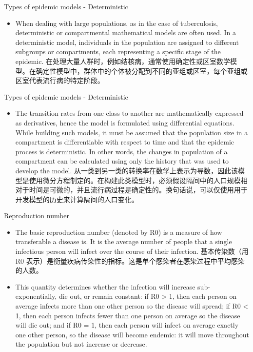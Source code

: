\documentclass[
  notheorems,
  aspectratio=54,
]{beamer}
\begin{document}
\begin{frame}{Types of epidemic models - Deterministic}
  \begin{itemize}
    \item When dealing with large populations, as in the case of tuberculosis, deterministic or compartmental mathematical models are often used. In a deterministic model, individuals in the population are assigned to different subgroups or compartments, each representing a specific stage of the epidemic. 在处理大量人群时，例如结核病，通常使用确定性或区室数学模型。在确定性模型中，群体中的个体被分配到不同的亚组或区室，每个亚组或区室代表流行病的特定阶段。
  \end{itemize}
\end{frame}

\begin{frame}{Types of epidemic models - Deterministic}
  \begin{itemize}
    \item The transition rates from one class to another are mathematically expressed as derivatives, hence the model is formulated using differential equations. While building such models, it must be assumed that the population size in a compartment is differentiable with respect to time and that the epidemic process is deterministic. In other words, the changes in population of a compartment can be calculated using only the history that was used to develop the model. 从一类到另一类的转换率在数学上表示为导数，因此该模型是使用微分方程制定的。在构建此类模型时，必须假设隔间中的人口规模相对于时间是可微的，并且流行病过程是确定性的。换句话说，可以仅使用用于开发模型的历史来计算隔间的人口变化。
  \end{itemize}
\end{frame}

\begin{frame}{Reproduction number}
  \begin{itemize}
    \item The basic reproduction number (denoted by R0) is a measure of how transferable a disease is. It is the average number of people that a single infectious person will infect over the course of their infection. 基本传染数（用 R0 表示）是衡量疾病传染性的指标。这是单个感染者在感染过程中平均感染的人数。
    \item This quantity determines whether the infection will increase sub-exponentially, die out, or remain constant: if R0 > 1, then each person on average infects more than one other person so the disease will spread; if R0 < 1, then each person infects fewer than one person on average so the disease will die out; and if R0 = 1, then each person will infect on average exactly one other person, so the disease will become endemic: it will move throughout the population but not increase or decrease.
  \end{itemize}
\end{frame}
\end{document}
